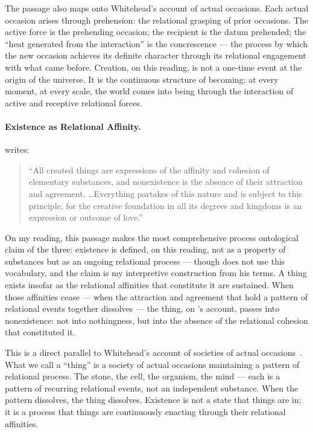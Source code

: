 The passage also maps onto Whitehead's account of actual occasions.
Each actual occasion arises through prehension: the relational grasping
of prior occasions.
The active force is the prehending occasion; the recipient is the datum
prehended; the ``heat generated from the interaction'' is the concrescence
--- the process by which the new occasion achieves its definite character
through its relational engagement with what came before.
Creation, on this reading, is not a one-time event at the origin of the
universe.
It is the continuous structure of becoming: at every moment, at every
scale, the world comes into being through the interaction of active and
receptive relational forces.

\paragraph{Existence as Relational Affinity.}
\AbdulBaha writes:
\begin{quote}
``All created things are expressions of the affinity and cohesion of
elementary substances, and nonexistence is the absence of their
attraction and agreement. \ldots Everything partakes of this nature and is
subject to this principle, for the creative foundation in all its
degrees and kingdoms is an expression or outcome of love.''
\citep[Talk 48]{PUP}
\end{quote}

On my reading, this passage makes the most comprehensive process ontological
claim of the three: existence is defined, on this reading, not as a property
of substances but as an ongoing relational process --- though \AbdulBaha does
not use this vocabulary, and the claim is my interpretive construction from
his terms.
A thing exists insofar as the relational affinities that constitute it
are sustained.
When those affinities cease --- when the attraction and agreement that
hold a pattern of relational events together dissolves --- the thing,
on \AbdulBaha's account, passes into nonexistence: not into nothingness,
but into the absence of the relational cohesion that constituted it.

This is a direct parallel to Whitehead's account of societies of actual
occasions~\citep{Whitehead1929}.
What we call a ``thing'' is a society of actual occasions maintaining
a pattern of relational process.
The stone, the cell, the organism, the mind --- each is a pattern of
recurring relational events, not an independent substance.
When the pattern dissolves, the thing dissolves.
Existence is not a state that things are in; it is a process that things
are continuously enacting through their relational affinities.

